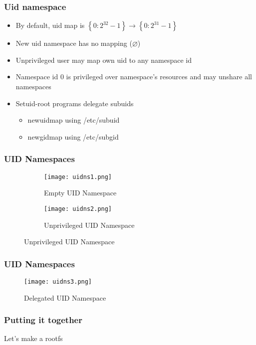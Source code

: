 \documentclass{beamer}
\begin{document}
\begin{frame}
\frametitle{Uid namespace}
	\begin{itemize}
	\item By default, uid map is $\left\{0:2^{32}-1\right\} \rightarrow \left\{ 0:2^{31}-1\right\}$
	\item New uid namespace has no mapping ($\varnothing$)
	\item Unprivileged user may map own uid to any namespace id
	\item Namespace id 0 is privileged over namespace's resources and may unshare all namespaces
	\item Setuid-root programs delegate subuids
		\begin{itemize}
		\item newuidmap using /etc/subuid
		\item newgidmap using /etc/subgid
		\end{itemize}
	\end{itemize}
\end{frame}

\begin{frame}
\frametitle{UID Namespaces}
\begin{figure}
\centering
\begin{subfigure}{.5\textwidth}
\centering
	\texttt{[image: uidns1.png]}
	\caption{Empty UID Namespace}
\end{subfigure}%
\begin{subfigure}{.5\textwidth}
\centering
	\texttt{[image: uidns2.png]}
	\caption{Unprivileged UID Namespace}
\end{subfigure}
\end{figure}
\end{frame}

\begin{frame}
\frametitle{UID Namespaces}
\begin{figure}
	\texttt{[image: uidns3.png]}
	\caption{Delegated UID Namespace}
\end{figure}
\end{frame}



\begin{frame}
\frametitle{Putting it together}
Let's make a rootfs
\end{frame}
\end{document}
